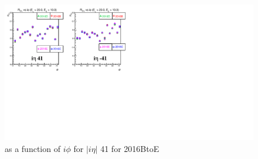 \begin{figure}
\centering
\includegraphics[width=0.99\linewidth]{../Figures/Chap2/ImageFiles_HF/Ratio/2016/RvsIphi2016BtoE/ieta41_E1E2Cut0Ietaiphi}
\caption{\ratiosl as a function of $i\phi$ for $|i\eta|$ 41 for 2016BtoE}
\label{fig:ieta41_E1E2Cut0Ietaiphi2016BtoE}
\end{figure}

